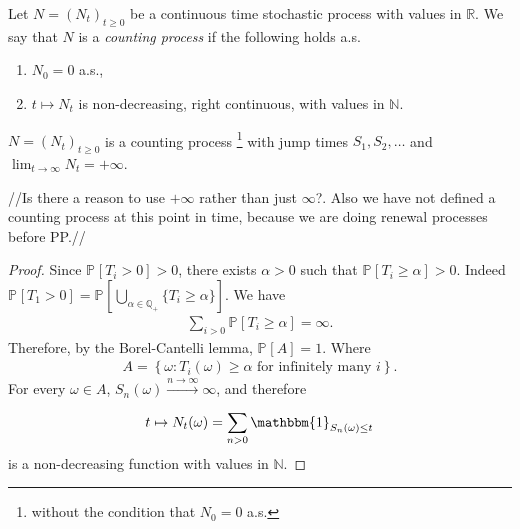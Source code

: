 {\color{blue}
\begin{defn}
	Let $N=(N_t)_{t \geq 0}$ be a continuous time stochastic process with values in $\mathbb{R}$. We say that $N$ is a \emph{counting process} if the following holds a.s.
\begin{enumerate}
	\item $N_0 = 0$ a.s.,
	\item  $t \mapsto N_t$ is non-decreasing, right continuous, with values in $\mathbb{N}$.
\end{enumerate}
\end{defn}
}

\begin{prop}[]
	$N = (N_t)_{t\geq 0}$ is a counting process \footnote{without the condition that $N_0=0$ a.s.} with jump times $S_1, S_2, \ldots $ and $\lim_{t \to \infty} N_t = + \infty$.
\end{prop}
{\color{blue} //Is there a reason to use $+\infty$ rather than just $\infty$?. Also we have not defined a counting process at this point in time, because we are doing renewal processes before PP.//}
\begin{proof}
	Since $\mathbb{P}_{} \left[ T_i>0 \right] >0$, there exists $\alpha > 0$ such that $\mathbb{P}_{} \left[  T_i \geq \alpha  \right] >0$. Indeed $\mathbb{P}_{} \left[ T_1 >0 \right]  = \mathbb{P}_{} \left[ \bigcup_{\alpha \in \mathbb{Q}_+} \{ T_i \geq \alpha\} \right] $. We have
	\begin{align}
		\sum_{i>0}^{} \mathbb{P}_{} \left[ T_i \geq \alpha  \right] = \infty.
	\end{align}
	Therefore, by {\color{blue} the} Borel-Cantelli lemma, $\mathbb{P}_{} \left[A\right] =1$. Where
	\begin{align}
	A=	\left\{\omega: T_i(\omega) \geq \alpha \textrm{ for infinitely many } i \right\}.
	\end{align}
	For every $\omega \in A$, $S_n(\omega) \stackrel{n \to \infty}{\to} \infty$, and therefore
	\begin{align}
		t \mapsto N_t(\omega) = \sum_{n> 0}^{} \mathbbm{1}_{S_n(\omega) \leq t} 
	\end{align}
is a non-decreasing function with values in $\mathbb{N}$.	
\end{proof}


